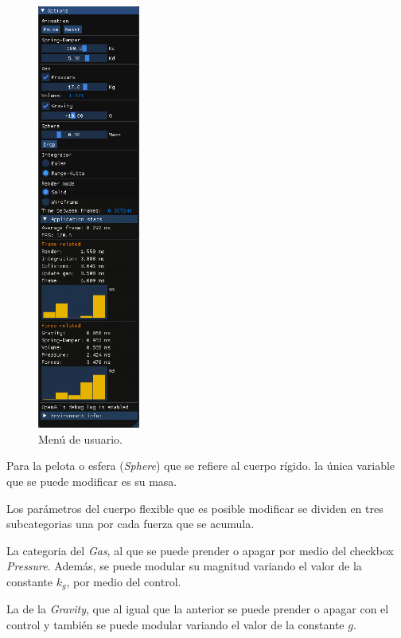 \begin{figure}
 \centering
 \includegraphics[width=0.3\textwidth]{Img/04/menu}
 \caption[Menú de usuario del programa]{Menú de usuario.}
 \label{programa:menu}
\end{figure}

Para la pelota o esfera (\emph{\textenglish{Sphere}}) que se refiere al cuerpo rígido.
la única variable que se puede modificar es su masa.

Los parámetros del cuerpo flexible que es posible modificar se dividen en tres subcategorias una por cada fuerza que se acumula.

La categoria del \emph{Gas}, al que se puede prender o apagar por medio del checkbox \emph{\textenglish{Pressure}}. 
Además, se puede modular su magnitud variando el valor de la constante $k_{g}$, por medio del control.

La de la \emph{\textenglish{Gravity}}, que al igual que la anterior se puede prender o apagar con el control  y también se puede modular variando el valor de la constante $g$.

